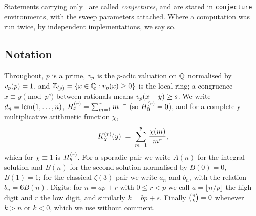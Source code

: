 Statements carrying only \Verified\ are called \emph{conjectures}, and are stated in
\texttt{conjecture} environments, with the sweep parameters attached. Where a computation
was run twice, by independent implementations, we say so.

\subsection{Notation}
\label{ssec:notation}

Throughout, $p$ is a prime, $v_p$ is the $p$-adic valuation on $\mathbb{Q}$ normalised by
$v_p(p)=1$, and $\mathbb{Z}_{(p)}=\{x\in\mathbb{Q}:v_p(x)\ge0\}$ is the local ring; a congruence
$x\equiv y\pmod{p^s}$ between rationals means $v_p(x-y)\ge s$. We write $d_n=\operatorname{lcm}(1,\dots,n)$,
$H^{(r)}_{x}=\sum_{m=1}^x m^{-r}$ (so $H^{(r)}_{0}=0$), and for a completely multiplicative
arithmetic function $\chi$,
\[
   K^{(r)}_{\chi}(y)\;=\;\sum_{m=1}^{y}\frac{\chi(m)}{m^{r}} ,
\]
which for $\chi\equiv1$ is $H^{(r)}_{y}$. For a sporadic pair we write $A(n)$ for the integral
solution and $B(n)$ for the second solution normalised by $B(0)=0$, $B(1)=1$; for the
classical $\zeta(3)$ pair we write $a_n$ and $b_n$, with the relation $b_n=6B(n)$. Digits:
for $n=ap+r$ with $0\le r<p$ we call $a=\lfloor n/p\rfloor$ the high digit and $r$ the low
digit, and similarly $k=bp+s$. Finally $\binom{n}{k}=0$ whenever $k>n$ or $k<0$, which we use
without comment.
